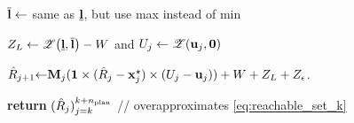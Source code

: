 \begin{algorithm}[t]
{    $\overline{{\mathbf{l}}} \leftarrow$ same as $\underline{{\mathbf{l}}}$, but use max instead of min  \label{ln:alglipupper}
    
    
    
     $Z_{L} \leftarrow \mathcal{Z}\!\left(\underline{{\mathbf{l}}},\overline{{\mathbf{l}}}\right) - W$ and $U_j \leftarrow \mathcal{Z}\!\left({\mathbf{u}}_j,{\mathbf{0}}\right)$ \label{ln:alglipZl}
     
     ${\hat{R}}_{j+1} {\leftarrow} {\mathbf{M}}_j ({\mathbf{1}} \times ({\hat{R}}_j-{\mathbf{x}}^\star_j)  \times (U_j- {\mathbf{u}}_j)) +  W +  Z_L + Z_\epsilon$. \label{ln:alglipRhat}
}
\textbf{return} $({\hat{R}}_j)_{j=k}^{k+{n_{\mathrm{\textnormal{plan}}}}}$ // overapproximates \eqref{eq:reachable_set_k}
\end{algorithm}

